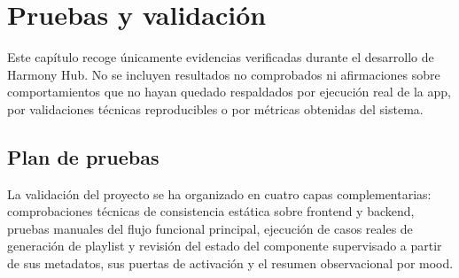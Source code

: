 \chapter{Pruebas y validación}
\label{ch:pruebas_validacion}

Este capítulo recoge únicamente evidencias verificadas durante el desarrollo de
Harmony Hub. No se incluyen resultados no comprobados ni afirmaciones sobre
comportamientos que no hayan quedado respaldados por ejecución real de la app,
por validaciones técnicas reproducibles o por métricas obtenidas del sistema.

\section{Plan de pruebas}
\label{sec:plan_pruebas}

La validación del proyecto se ha organizado en cuatro capas complementarias:
comprobaciones técnicas de consistencia estática sobre frontend y backend,
pruebas manuales del flujo funcional principal, ejecución de casos reales de
generación de playlist y revisión del estado del componente supervisado a
partir de sus metadatos, sus puertas de activación y el resumen observacional
por mood.

